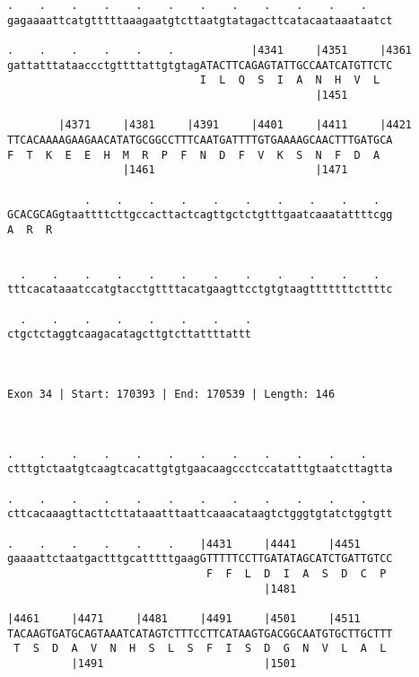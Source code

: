 \documentclass{article}
\begin{document}
\begin{Verbatim}
.    .    .    .    .    .    .    .    .    .    .    .    
gagaaaattcatgtttttaaagaatgtcttaatgtatagacttcatacaataaataatct
                                                            
.    .    .    .    .    .            |4341     |4351     |4361
gattatttataaccctgttttattgtgtagATACTTCAGAGTATTGCCAATCATGTTCTC
                              I  L  Q  S  I  A  N  H  V  L  
                                                |1451       
  
        |4371     |4381     |4391     |4401     |4411     |4421
TTCACAAAAGAAGAACATATGCGGCCTTTCAATGATTTTGTGAAAAGCAACTTTGATGCA
F  T  K  E  E  H  M  R  P  F  N  D  F  V  K  S  N  F  D  A  
                  |1461                         |1471       
  
            .    .    .    .    .    .    .    .    .    .  
GCACGCAGgtaattttcttgccacttactcagttgctctgtttgaatcaaatattttcgg
A  R  R                                                     
                                                            
  
  .    .    .    .    .    .    .    .    .    .    .    .  
tttcacataaatccatgtacctgttttacatgaagttcctgtgtaagtttttttcttttc
                                                            
  .    .    .    .    .    .    .    .
ctgctctaggtcaagacatagcttgtcttattttattt
                                      
                                      
 
Exon 34 | Start: 170393 | End: 170539 | Length: 146



.    .    .    .    .    .    .    .    .    .    .    .    
ctttgtctaatgtcaagtcacattgtgtgaacaagccctccatatttgtaatcttagtta
                                                            
.    .    .    .    .    .    .    .    .    .    .    .    
cttcacaaagttacttcttataaatttaattcaaacataagtctgggtgtatctggtgtt
                                                            
.    .    .    .    .    .    |4431     |4441     |4451     
gaaaattctaatgactttgcatttttgaagGTTTTTCCTTGATATAGCATCTGATTGTCC
                               F  F  L  D  I  A  S  D  C  P 
                                        |1481               
  
|4461     |4471     |4481     |4491     |4501     |4511     
TACAAGTGATGCAGTAAATCATAGTCTTTCCTTCATAAGTGACGGCAATGTGCTTGCTTT
 T  S  D  A  V  N  H  S  L  S  F  I  S  D  G  N  V  L  A  L 
          |1491                         |1501               
  

\end{Verbatim}
\end{document}
